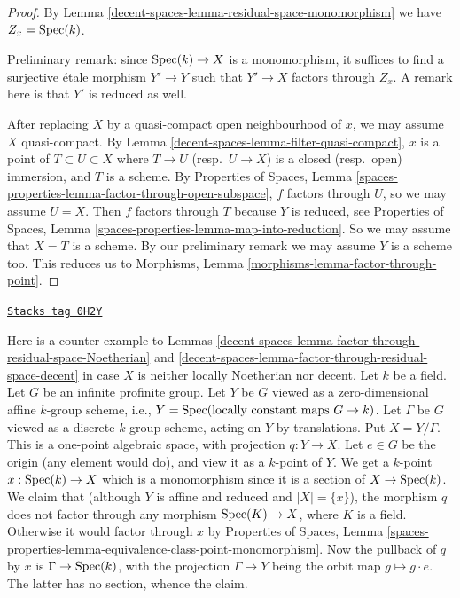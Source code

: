\begin{proof}
By Lemma \ref{decent-spaces-lemma-residual-space-monomorphism} we have $Z_x = \operatorname{Spec}(k)$.

\medskip\noindent
Preliminary remark: since $\operatorname{Spec}(k) \to X$ is a monomorphism,
it suffices to find
a surjective \'etale morphism $Y' \to Y$ such that $Y' \to X$
factors through $Z_x$. A remark here is that $Y'$ is reduced as well.

\medskip\noindent
After replacing $X$ by a quasi-compact open neighbourhood of $x$,
we may assume $X$ quasi-compact. By Lemma \ref{decent-spaces-lemma-filter-quasi-compact}, $x$
is a point of $T \subset U \subset X$ where $T \to U$ (resp.\ $U \to X$)
is a closed (resp.\ open) immersion, and $T$ is a scheme.
By Properties of Spaces, Lemma
\ref{spaces-properties-lemma-factor-through-open-subspace},
$f$ factors through $U$, so we may assume $U = X$. Then $f$
factors through $T$ because $Y$ is reduced, see
Properties of Spaces, Lemma \ref{spaces-properties-lemma-map-into-reduction}.
So we may assume that $X = T$ is a scheme.
By our preliminary remark we may assume $Y$ is a scheme too.
This reduces us to Morphisms, Lemma \ref{morphisms-lemma-factor-through-point}.
\end{proof}

\begin{example}
\label{decent-spaces-example-does-not-factor-through-residual-gerbe}
\href{https://stacks.math.columbia.edu/tag/0H2Y}{\texttt{Stacks tag 0H2Y}}

Here is a counter example to
Lemmas \ref{decent-spaces-lemma-factor-through-residual-space-Noetherian} and
\ref{decent-spaces-lemma-factor-through-residual-space-decent}
in case $X$ is neither locally Noetherian nor decent.
Let $k$ be a field. Let $G$ be an infinite profinite group.
Let $Y$ be $G$ viewed as a zero-dimensional affine $k$-group scheme, i.e.,
$Y = \operatorname{Spec}(\text{locally constant maps } G \to k)$.
Let $\Gamma$ be $G$ viewed as a discrete $k$-group scheme,
acting on $Y$ by translations. Put $X = Y/\Gamma$.
This is a one-point algebraic space, with projection $q : Y \to X$.
Let $e \in G$ be the origin (any element would do), and view
it as a $k$-point of $Y$. We get a $k$-point $x : \operatorname{Spec}(k) \to X$
which is a monomorphism since it is a section of $X \to \operatorname{Spec}(k)$.
We claim that (although $Y$ is affine and reduced and $|X| = \{x\}$),
the morphism $q$ does not factor through any morphism $\operatorname{Spec}(K) \to X$,
where $K$ is a field. Otherwise it would factor through
$x$ by Properties of Spaces, Lemma
\ref{spaces-properties-lemma-equivalence-class-point-monomorphism}.
Now the pullback of $q$ by $x$ is $\Gamma \to \operatorname{Spec}(k)$, with
the projection $\Gamma \to Y$ being the orbit map $g \mapsto g \cdot e$.
The latter has no section, whence the claim.
\end{example}

